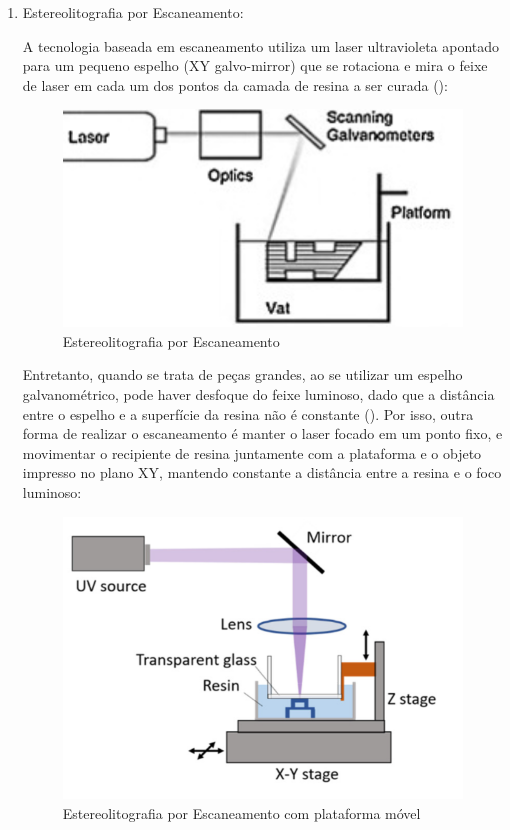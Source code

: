 \documentclass[12pt, english]{article}
\begin{document}
\begin{enumerate}[leftmargin=*, listparindent=0.7cm]
\item {Estereolitografia por Escaneamento: 

A tecnologia baseada em escaneamento utiliza um laser ultravioleta apontado para um pequeno espelho (XY galvo-mirror) que se rotaciona e mira o feixe de laser em cada um dos pontos da camada de resina a ser curada (\cite{Emami2014}):

\begin{figure}[H]
	\centering
	\includegraphics[scale=0.5]{Stereolitography-Scanner.png}
	\caption{Estereolitografia por Escaneamento}
\end{figure}

Entretanto, quando se trata de peças grandes, ao se utilizar um espelho galvanométrico, pode haver desfoque do feixe luminoso, dado que a distância entre o espelho e a superfície da resina não é constante (\cite{Huang2020}). 
Por isso, outra forma de realizar o escaneamento é manter o laser focado em um ponto fixo, e movimentar o recipiente de resina juntamente com a plataforma e o objeto impresso no plano XY, mantendo constante a distância entre a resina e o foco luminoso:

\begin{figure}[H]
	\centering
	\includegraphics[scale=0.5]{Stereolitography-Scanner-XY.png}
	\caption{Estereolitografia por Escaneamento com plataforma móvel}
\end{figure}

}
\end{enumerate}
\end{document}
